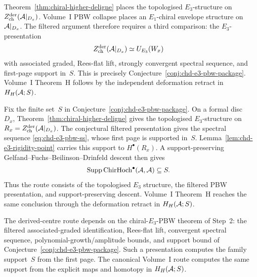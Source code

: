 \begin{remark}%
\label{rem:H-concentration-via-E3-rigidity-type-error-retraction}%
%
%
Theorem~\ref{thm:chiral-higher-deligne} places the topologised
$E_3$-structure on
$Z^{\mathrm{der}}_{\mathrm{ch}}(\mathcal{A}|_{D_x})$.  Volume~I PBW collapse
places an $E_1$-chiral envelope structure on $\mathcal{A}|_{D_x}$. The
filtered argument therefore requires a third comparison: the
$E_3$-presentation
\[
 Z^{\mathrm{der}}_{\mathrm{ch}}(\mathcal{A}|_{D_x})
 \simeq U_{E_3}(W_x)
\]
with associated graded, Rees-flat lift, strongly convergent spectral
sequence, and first-page support in~$S$.  This is precisely
Conjecture~\ref{conj:chd-e3-pbw-package}.  Volume~I Theorem~H follows
by the independent deformation retract in $H_H(\mathcal{A};S)$.
\end{remark}

\begin{remark}%
\label{rem:H-concentration-via-E3-rigidity-proof-route}%
%
Fix the finite set~$S$ in
Conjecture~\ref{conj:chd-e3-pbw-package}.  On a formal disc~$D_x$,
Theorem~\ref{thm:chiral-higher-deligne} gives the topologised
$E_3$-structure on
$R_x=Z^{\mathrm{der}}_{\mathrm{ch}}(\mathcal{A}|_{D_x})$.  The conjectural
filtered presentation gives the spectral sequence
\eqref{eq:chd-e3-pbw-ss}, whose first page is supported in~$S$.
Lemma~\ref{lem:chd-e3-rigidity-point} carries this support to
$H^\bullet(R_x)$.  A support-preserving
Gelfand--Fuchs--Beilinson--Drinfeld descent then gives
\[
 \operatorname{Supp}\mathrm{ChirHoch}^\bullet(\mathcal{A},\mathcal{A})\subseteq S.
\]
Thus the route consists of the topologised $E_3$ structure, the
filtered PBW presentation, and support-preserving descent.  Volume~I
Theorem~H reaches the same conclusion through the deformation retract
in $H_H(\mathcal{A};S)$.
\end{remark}

\begin{remark}%
\label{rem:chd-consequence-not-hypothesis}%
%
The derived-centre route depends on the chiral-$E_3$-PBW theorem
of Step~2: the filtered associated-graded identification, Rees-flat
lift, convergent spectral sequence, polynomial-growth/amplitude bounds,
and support bound of Conjecture~\ref{conj:chd-e3-pbw-package}.  Such a
presentation computes the family support~$S$ from the first page.
The canonical Volume~I route computes the same support from the
explicit maps and homotopy in $H_H(\mathcal{A};S)$.
\end{remark}

